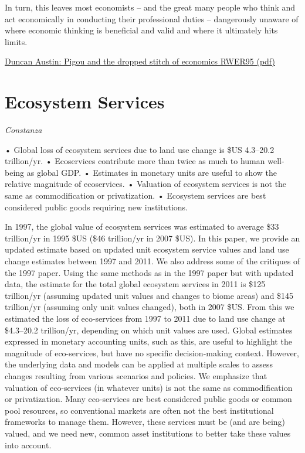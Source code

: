 \documentclass[
]{book}
\begin{document}
In turn, this leaves most economists -- and the great many people who think and act
economically in conducting their professional duties -- dangerously unaware of where
economic thinking is beneficial and valid and where it ultimately hits limits.

\href{pdf/Austin_2021_Pigou_and_the_dropped_stitch_of_economics_RWER95.pdf}{Duncan Austin: Pigou and the dropped stitch of economics RWER95 (pdf)}

\hypertarget{ecosystem-services}{%
\section{Ecosystem Services}\label{ecosystem-services}}

\emph{Constanza}

• Global loss of ecosystem services due to land use change is \$US 4.3--20.2 trillion/yr.
• Ecoservices contribute more than twice as much to human well-being as global GDP.
• Estimates in monetary units are useful to show the relative magnitude of ecoservices.
• Valuation of ecosystem services is not the same as commodification or privatization.
• Ecosystem services are best considered public goods requiring new institutions.

In 1997, the global value of ecosystem services was estimated to average \$33 trillion/yr in 1995 \$US (\$46 trillion/yr in 2007 \$US). In this paper, we provide an updated estimate based on updated unit ecosystem service values and land use change estimates between 1997 and 2011. We also address some of the critiques of the 1997 paper. Using the same methods as in the 1997 paper but with updated data, the estimate for the total global ecosystem services in 2011 is \$125 trillion/yr (assuming updated unit values and changes to biome areas) and \$145 trillion/yr (assuming only unit values changed), both in 2007 \$US. From this we estimated the loss of eco-services from 1997 to 2011 due to land use change at \$4.3--20.2 trillion/yr, depending on which unit values are used. Global estimates expressed in monetary accounting units, such as this, are useful to highlight the magnitude of eco-services, but have no specific decision-making context. However, the underlying data and models can be applied at multiple scales to assess changes resulting from various scenarios and policies. We emphasize that valuation of eco-services (in whatever units) is not the same as commodification or privatization. Many eco-services are best considered public goods or common pool resources, so conventional markets are often not the best institutional frameworks to manage them. However, these services must be (and are being) valued, and we need new, common asset institutions to better take these values into account.
\end{document}
